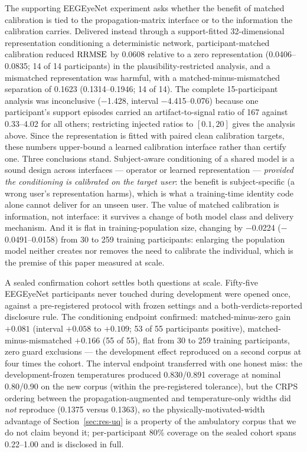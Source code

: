The supporting EEGEyeNet experiment asks whether the benefit of matched calibration is tied to the propagation-matrix interface or to the information the calibration carries. Delivered instead through a support-fitted 32-dimensional representation conditioning a deterministic network, participant-matched calibration reduced $\mathrm{RRMSE}$ by 0.0608 relative to a zero representation (0.0406--0.0835; 14 of 14 participants) in the plausibility-restricted analysis, and a mismatched representation was harmful, with a matched-minus-mismatched separation of 0.1623 (0.1314--0.1946; 14 of 14). The complete 15-participant analysis was inconclusive ($-$1.428, interval $-$4.415--0.076) because one participant's support episodes carried an artifact-to-signal ratio of 167 against 0.33--4.02 for all others; restricting injected ratios to $[0.1,20]$ gives the analysis above. Since the representation is fitted with paired clean calibration targets, these numbers upper-bound a learned calibration interface rather than certify one. Three conclusions stand. Subject-aware conditioning of a shared model is a sound design across interfaces --- operator or learned representation --- \emph{provided the conditioning is calibrated on the target user}: the benefit is subject-specific (a wrong user's representation harms), which is what a training-time identity code alone cannot deliver for an unseen user. The value of matched calibration is information, not interface: it survives a change of both model class and delivery mechanism. And it is flat in training-population size, changing by $-$0.0224 ($-$0.0491--0.0158) from 30 to 259 training participants: enlarging the population model neither creates nor removes the need to calibrate the individual, which is the premise of this paper measured at scale.

A sealed confirmation cohort settles both questions at scale. Fifty-five EEGEyeNet participants never touched during development were opened once, against a pre-registered protocol with frozen settings and a both-verdicts-reported disclosure rule. The conditioning endpoint confirmed: matched-minus-zero gain $+0.081$ (interval $+0.058$ to $+0.109$; 53 of 55 participants positive), matched-minus-mismatched $+0.166$ (55 of 55), flat from 30 to 259 training participants, zero guard exclusions --- the development effect reproduced on a second corpus at four times the cohort. The interval endpoint transferred with one honest miss: the development-frozen temperatures produced 0.830/0.891 coverage at nominal 0.80/0.90 on the new corpus (within the pre-registered tolerance), but the CRPS ordering between the propagation-augmented and temperature-only widths did \emph{not} reproduce (0.1375 versus 0.1363), so the physically-motivated-width advantage of Section~\ref{sec:res-uq} is a property of the ambulatory corpus that we do not claim beyond it; per-participant 80\% coverage on the sealed cohort spans 0.22--1.00 and is disclosed in full.

